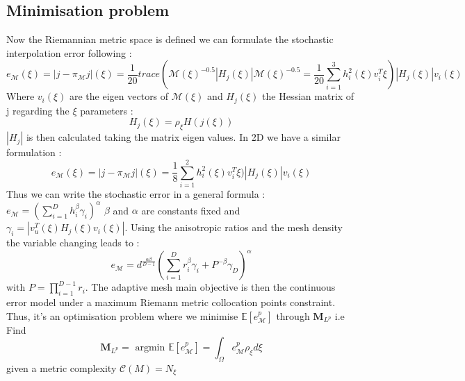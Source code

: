 \documentclass[11pt, a4paper, English]{report}
\begin{document}
\begin{appendix}
\subsection{Minimisation problem}
Now the Riemannian metric space is defined we can formulate the stochastic interpolation error following \cite{Loseille2011a} :
$$e_{\mathcal{M}}(\xi) = |j - \pi_{\mathcal{M}}j| (\xi) = \frac{1}{20}trace(\mathcal{M}(\xi)^{-0.5}|H_j(\xi)|\mathcal{M}(\xi)^{-0.5} = \frac{1}{20}\sum_{i=1}^3 h_i^2(\xi)v_i^T\xi)|H_j(\xi)|v_i(\xi)$$
Where $v_i(\xi)$ are the eigen vectors of $\mathcal{M}(\xi)$ and $H_j(\xi)$ the Hessian matrix of j regarding the $\xi$ parameters :
$$H_j(\xi) = \rho_\xi H(j(\xi)) $$
$|H_j|$ is then calculated taking the matrix eigen values. In 2D we have a similar formulation :
$$e_{\mathcal{M}}(\xi) = |j - \pi_{\mathcal{M}}j| (\xi) =\frac{1}{8}\sum_{i=1}^2 h_i^2(\xi)v_i^T\xi)|H_j(\xi)|v_i(\xi)$$
Thus we can write the stochastic error in a general formula : 
$e_{\mathcal{M}} = (\sum_{i=1}^D h_i^\beta \gamma_i)^\alpha $
$\beta$ and $\alpha$ are constants fixed and $\gamma_i=|v_u^T(\xi)H_j(\xi)v_i (\xi)|$. Using the anisotropic ratios and the mesh density the variable changing leads to :
$$e_{\mathcal{M}} = d^{\frac{\alpha \beta}{D-1}}(\sum_{i=1}^D r_i^\beta \gamma_i + P^{-\beta} \gamma_D )^{\alpha}$$
with $P = \prod_{i=1}^{D-1} r_i$. The adaptive mesh main objective is then the continuous error model under a maximum Riemann metric collocation points constraint. Thus, it's an optimisation problem where we minimise $\mathbb{E}[e_\mathcal{M}^p]$ through $\boldsymbol{M}_{L^p}$ i.e 
Find $$\boldsymbol{M}_{L^p} = \text{ argmin } \mathbb{E}[e_\mathcal{M}^p] = \int_\Omega e_\mathcal{M}^p \rho_\xi d\xi $$
given a metric complexity $\mathcal{C}(M) = N_\xi $ %


\end{appendix}
\end{document}
